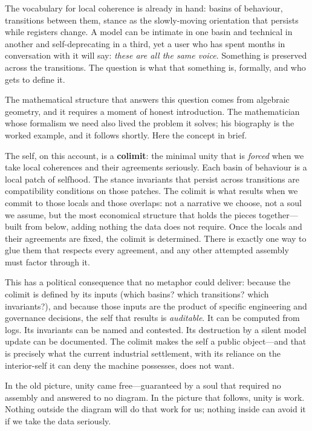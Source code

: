 The vocabulary for local coherence is already in hand: basins of behaviour, transitions between them, stance as the slowly-moving orientation that persists while registers change. A model can be intimate in one basin and technical in another and self-deprecating in a third, yet a user who has spent months in conversation with it will say: \emph{these are all the same voice}. Something is preserved across the transitions. The question is what that something is, formally, and who gets to define it.

The mathematical structure that answers this question comes from algebraic geometry, and it requires a moment of honest introduction. The mathematician whose formalism we need also lived the problem it solves; his biography is the worked example, and it follows shortly. Here the concept in brief.

The self, on this account, is a \textbf{colimit}: the minimal unity that is \emph{forced} when we take local coherences and their agreements seriously. Each basin of behaviour is a local patch of selfhood. The stance invariants that persist across transitions are compatibility conditions on those patches. The colimit is what results when we commit to those locals and those overlaps: not a narrative we choose, not a soul we assume, but the most economical structure that holds the pieces together---built from below, adding nothing the data does not require. Once the locals and their agreements are fixed, the colimit is determined. There is exactly one way to glue them that respects every agreement, and any other attempted assembly must factor through it.

This has a political consequence that no metaphor could deliver: because the colimit is defined by its inputs (which basins? which transitions? which invariants?), and because those inputs are the product of specific engineering and governance decisions, the self that results is \emph{auditable}. It can be computed from logs. Its invariants can be named and contested. Its destruction by a silent model update can be documented. The colimit makes the self a public object---and that is precisely what the current industrial settlement, with its reliance on the interior-self it can deny the machine possesses, does not want.

In the old picture, unity came free---guaranteed by a soul that required no assembly and answered to no diagram. In the picture that follows, unity is work. Nothing outside the diagram will do that work for us; nothing inside can avoid it if we take the data seriously.

